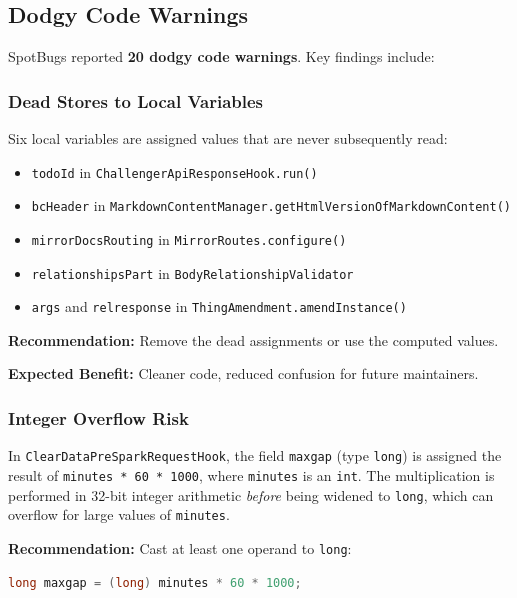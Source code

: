 \documentclass[11pt,a4paper]{article}
\begin{document}
\subsection{Dodgy Code Warnings}

SpotBugs reported \textbf{20 dodgy code warnings}. Key findings include:

\subsubsection{Dead Stores to Local Variables}

Six local variables are assigned values that are never subsequently read:
\begin{itemize}
    \item \texttt{todoId} in \texttt{ChallengerApiResponseHook.run()}
    \item \texttt{bcHeader} in \texttt{MarkdownContentManager.getHtmlVersionOfMarkdownContent()}
    \item \texttt{mirrorDocsRouting} in \texttt{MirrorRoutes.configure()}
    \item \texttt{relationshipsPart} in \texttt{BodyRelationshipValidator}
    \item \texttt{args} and \texttt{relresponse} in \texttt{ThingAmendment.amendInstance()}
\end{itemize}

\noindent\textbf{Recommendation:} Remove the dead assignments or use the computed values.

\noindent\textbf{Expected Benefit:} Cleaner code, reduced confusion for future maintainers.

\subsubsection{Integer Overflow Risk}

In \texttt{ClearDataPreSparkRequestHook}, the field \texttt{maxgap} (type \texttt{long}) is assigned the result of \texttt{minutes * 60 * 1000}, where \texttt{minutes} is an \texttt{int}. The multiplication is performed in 32-bit integer arithmetic \emph{before} being widened to \texttt{long}, which can overflow for large values of \texttt{minutes}.

\noindent\textbf{Recommendation:} Cast at least one operand to \texttt{long}:
\begin{lstlisting}[language=Java]
long maxgap = (long) minutes * 60 * 1000;
\end{lstlisting}
\end{document}
